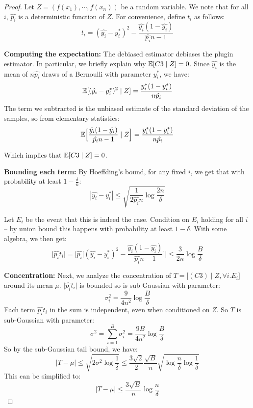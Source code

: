 \begin{proof}
Let $Z = (f(x_1), \cdots, f(x_n))$ be a random variable. We note that for all $i$, $\hat{p_i}$ is a deterministic function of $Z$. For convenience, define $t_i$ as follows:
\[ t_i = (\hat{y_i} - y_i^*)^2 - \frac{\hat{y_i}(1 - \hat{y_i})}{\hat{p_i}n-1} \]

\textbf{Computing the expectation:} The debiased estimator debiases the plugin estimator. In particular, we briefly explain why $\mathbb{E}[C3 \mid Z] = 0$. Since $\hat{y_i}$ is the mean of $n\hat{p_i}$ draws of a Bernoulli with parameter $y_i^*$, we have:
\[ \mathbb{E}[(\hat{y_i} - y_i^*)^2 \mid Z] = \frac{y_i^*(1 - y_i^*)}{n\hat{p_i}} \] 
The term we subtracted is the unbiased estimate of the standard deviation of the samples, so from elementary statistics:
\[ \mathbb{E}\Big[\frac{\hat{y_i}(1 - \hat{y_i})}{\hat{p_i}n-1} \mid Z\Big] = \frac{y_i^*(1 - y_i^*)}{n\hat{p_i}} \]

Which implies that $\mathbb{E}[C3 \mid Z] = 0$.

\textbf{Bounding each term:} By Hoeffding's bound, for any fixed $i$, we get that with probability at least $1 - \frac{\delta}{n}$: 
\[ |\hat{y_i} - y_i^*| \leq \sqrt{\frac{1}{2\hat{p_i}n} \log{\frac{2n}{\delta}}} \]

Let $E_i$ be the event that this is indeed the case. Condition on $E_i$ holding for all $i$ -- by union bound this happens with probability at least $1 - \delta$.
With some algebra, we then get:
\[ \lvert \hat{p_i}t_i \rvert = \Big\lvert \hat{p_i}\Big[ (\hat{y_i} - y_i^*)^2 - \frac{\hat{y_i}(1 - \hat{y_i})}{\hat{p_i}n-1} \Big] \Big\rvert \leq \frac{3}{2n} \log{\frac{B}{\delta}} \]

\textbf{Concentration:} Next, we analyze the concentration of $T = \big[(C3) \mid Z, \forall i. E_i\big]$ around its mean $\mu$. $\lvert \hat{p_i}t_i \rvert$ is bounded so is sub-Gaussian with parameter:
\[ \sigma_i^2 = \frac{9}{4n^2}\log{\frac{B}{\delta}} \]
Each term $\hat{p_i}t_i$ in the sum is independent, even when conditioned on $Z$.
So $T$ is sub-Gaussian with parameter:
\[ \sigma^2 = \sum_{i=1}^B \sigma_i^2 = \frac{9B}{4n^2}\log{\frac{B}{\delta}} \]
So by the sub-Gaussian tail bound, we have:
\[ \lvert T - \mu \rvert \leq \sqrt{2\sigma^2\log{\frac{1}{\delta}}} \leq \frac{3\sqrt{2}}{2} \frac{\sqrt{B}}{n} \sqrt{\log{\frac{n}{\delta}} \log{\frac{1}{\delta}}} \]
This can be simplified to:
\[ \lvert T - \mu \rvert \leq \frac{3\sqrt{B}}{n} \log{\frac{n}{\delta}} \]


\end{proof}
